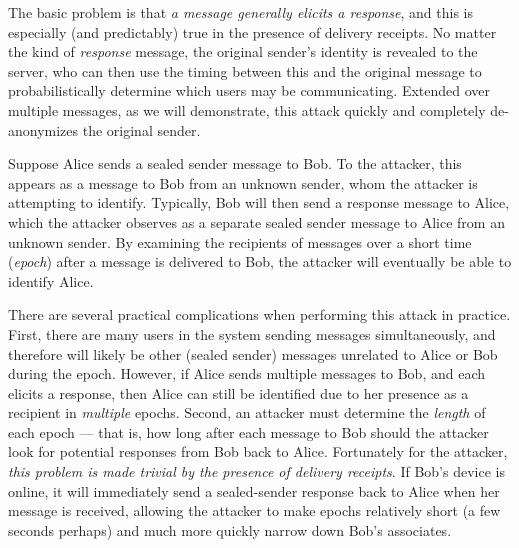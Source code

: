 The basic problem is that \emph{a message generally elicits a response},
and this is especially (and predictably) true in the presence of
delivery receipts.  No matter the kind of {\em response} message, the original sender's identity is revealed to the server,
who can then use the timing between this and the original message to
probabilistically determine which users may be communicating. Extended
over multiple messages, as we will demonstrate, this attack quickly and
completely de-anonymizes the original sender.

Suppose Alice sends a sealed sender message to Bob. To the attacker, this
appears as a message to Bob from an unknown sender, whom the attacker is
attempting to identify.
Typically, Bob will then send a response message to Alice,
which the
attacker observes as a separate sealed sender message to Alice from an
unknown sender.
By examining the recipients of messages over a short time (\emph{epoch})
after a message is delivered to Bob, the attacker will eventually be able to identify Alice.

There are several practical complications when performing this attack in
practice. First, there are many users in the system sending
messages simultaneously, and therefore will likely be other (sealed sender)
messages unrelated to Alice or Bob during the epoch. However, if Alice sends
multiple messages to Bob, and each elicits a response, then Alice can
still be identified due to her presence as a recipient in {\em multiple}
epochs.  Second, an attacker must determine the {\em length} of each epoch --- that is, how long after each message to Bob should the
attacker look for potential responses from Bob back to Alice.
Fortunately for the attacker, \emph{this problem is made trivial by the
presence of delivery receipts}. If Bob's device is online, it will
immediately send a sealed-sender response back to Alice when her message
is received, allowing the attacker to make epochs relatively short (a
few seconds perhaps) and much more quickly narrow down Bob's associates.




